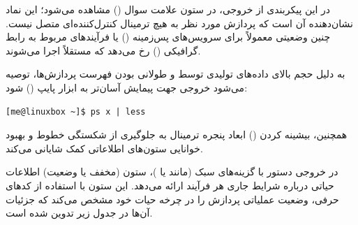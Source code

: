 در این پیکربندی از خروجی، در ستون  علامت سوال () مشاهده می‌شود؛ این نماد نشان‌دهنده آن است که پردازش مورد نظر به هیچ ترمینال کنترل‌کننده‌ای متصل نیست. چنین وضعیتی معمولاً برای سرویس‌های پس‌زمینه () یا فرآیندهای مربوط به رابط گرافیکی () رخ می‌دهد که مستقلاً اجرا می‌شوند.

به دلیل حجم بالای داده‌های تولیدی توسط  و طولانی بودن فهرست پردازش‌ها، توصیه می‌شود خروجی جهت پیمایش آسان‌تر به ابزار  پایپ () شود:

\begin{latin}
\begin{lstlisting}
[me@linuxbox ~]$ ps x | less
\end{lstlisting}
\end{latin}

همچنین، بیشینه کردن () ابعاد پنجره ترمینال به جلوگیری از شکستگی خطوط و بهبود خوانایی ستون‌های اطلاعاتی کمک شایانی می‌کند.

در خروجی دستور  با گزینه‌های سبک  (مانند  یا )، ستون  (مخفف  یا وضعیت) اطلاعات حیاتی درباره شرایط جاری هر فرآیند ارائه می‌دهد. این ستون با استفاده از کدهای حرفی، وضعیت عملیاتی پردازش را در چرخه حیات خود مشخص می‌کند که جزئیات آن‌ها در جدول زیر تدوین شده است.

